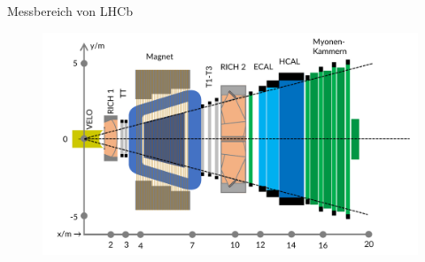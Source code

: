 \begin{frame}{Messbereich von LHCb}
    \begin{figure}[h]
    \centering
    \includegraphics[width=\textwidth]{Figures Introductory Lecture/LHCb Detector/LHCb_10_DE.png}
    \end{figure}
\end{frame}

